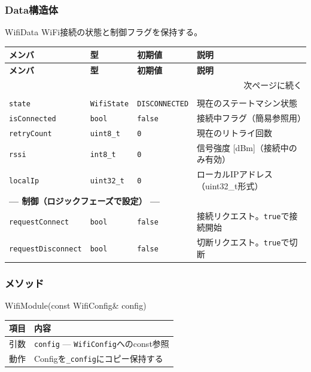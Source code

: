 \subsubsection{Data構造体}

\begin{funcblock}{WifiData}
WiFi接続の状態と制御フラグを保持する。

\begin{longtable}{l l l p{3.8cm}}
\toprule
\textbf{メンバ} & \textbf{型} & \textbf{初期値} & \textbf{説明} \\
\midrule
\endfirsthead
\toprule
\textbf{メンバ} & \textbf{型} & \textbf{初期値} & \textbf{説明} \\
\midrule
\endhead
\midrule
\multicolumn{4}{r}{\small 次ページに続く} \\
\endfoot
\bottomrule
\endlastfoot
\multicolumn{4}{l}{\textbf{--- 状態（入力フェーズで更新） ---}} \\
\texttt{state}       & \texttt{WifiState} & \texttt{DISCONNECTED} & 現在のステートマシン状態 \\
\texttt{isConnected} & \texttt{bool}      & \texttt{false}        & 接続中フラグ（簡易参照用） \\
\texttt{retryCount}  & \texttt{uint8\_t}  & \texttt{0}            & 現在のリトライ回数 \\
\texttt{rssi}        & \texttt{int8\_t}   & \texttt{0}            & 信号強度 [dBm]（接続中のみ有効） \\
\texttt{localIp}     & \texttt{uint32\_t} & \texttt{0}            & ローカルIPアドレス（uint32\_t形式） \\
\midrule
\multicolumn{4}{l}{\textbf{--- 制御（ロジックフェーズで設定） ---}} \\
\texttt{requestConnect}    & \texttt{bool} & \texttt{false} & 接続リクエスト。\texttt{true}で接続開始 \\
\texttt{requestDisconnect} & \texttt{bool} & \texttt{false} & 切断リクエスト。\texttt{true}で切断 \\
\end{longtable}
\end{funcblock}

\subsubsection{メソッド}

\begin{funcblock}{WifiModule(const WifiConfig\& config)}
\begin{tabularx}{\textwidth}{l X}
\toprule
\textbf{項目} & \textbf{内容} \\
\midrule
引数   & \texttt{config} --- \texttt{WifiConfig}へのconst参照 \\
動作   & Configを\texttt{\_config}にコピー保持する \\
\bottomrule
\end{tabularx}
\end{funcblock}

